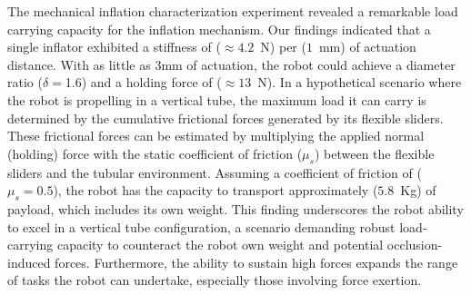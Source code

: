 \documentclass[letterpaper, 10 pt, conference]{ieeeconf}  %
\begin{document}
The mechanical inflation characterization experiment revealed a remarkable load carrying capacity for the inflation mechanism. Our findings indicated that a single inflator exhibited a stiffness of ($\approx 4.2$~N) per ($1$~mm) of actuation distance. With as little as 3mm of actuation, the robot could achieve a diameter ratio ($\delta=$1.6) and a holding force of ($\approx13$~N). In a hypothetical scenario where the robot is propelling in a vertical tube, the maximum load it can carry is determined by the cumulative frictional forces generated by its flexible sliders. These frictional forces can be estimated by multiplying the applied normal (holding) force with the static coefficient of friction ($\mu_{s}$) between the flexible sliders and the tubular environment. Assuming a coefficient of friction of ($\mu_{s}=0.5$), the robot has the capacity to transport approximately ($5.8$~Kg) of payload, which includes its own weight. This finding underscores the robot ability to excel in a vertical tube configuration, a scenario demanding robust load-carrying capacity to counteract the robot own weight and potential occlusion-induced forces. Furthermore, the ability to sustain high forces expands the range of tasks the robot can undertake, especially those involving force exertion. 

\addtolength{\textheight}{-9.05cm}   %
\end{document}
